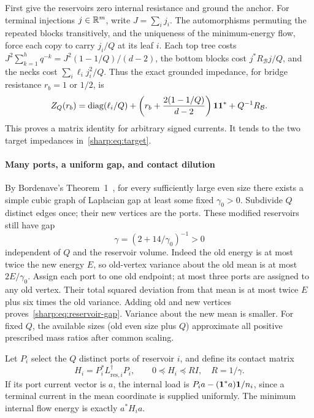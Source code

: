 First give the reservoirs zero internal resistance and ground the
anchor. For terminal injections $j\in\mathbb R^m$, write $J=\sum_i j_i$.
The automorphisms permuting the repeated blocks transitively, and the
uniqueness of the minimum-energy flow, force each copy to carry
$j_i/Q$ at its leaf $i$. Each top tree costs
$J^2\sum_{k=1}^h q^{-k}=J^2(1-1/Q)/(d-2)$, the bottom
blocks cost $j^*R_{\mathcal B}j/Q$, and the necks cost
$\sum_i\ell_i j_i^2/Q$. Thus the exact grounded impedance, for bridge
resistance $r_b=1$ or $1/2$, is
\begin{equation}\label{sharp:eq:ideal-impedance}
 Z_Q(r_b)=\operatorname{diag}(\ell_i/Q)+\left(r_b+\frac{2(1-1/Q)}{d-2}\right)\boldsymbol 1\boldsymbol 1^*
                                      +Q^{-1}R_{\mathcal B}.
\end{equation}
This proves a matrix identity for arbitrary signed currents. It tends
to the two target impedances in~\eqref{sharp:eq:target}.

\paragraph{Many ports, a uniform gap, and contact dilution}
By Bordenave's Theorem~1~\cite{Bordenave}, for every sufficiently large
even size there exists a simple cubic graph of Laplacian gap at least
some fixed $\gamma_0>0$. Subdivide $Q$ distinct edges once; their new
vertices are the ports. These modified reservoirs still have gap
\begin{equation}\label{sharp:eq:reservoir-gap}
                    \gamma=(2+14/\gamma_0)^{-1}>0
\end{equation}
independent of $Q$ and the reservoir volume. Indeed the old energy is
at most twice the new energy $E$, so old-vertex variance about the old
mean is at most $2E/\gamma_0$. Assign each port to one old endpoint;
at most three ports are assigned to any old vertex. Their total squared
deviation from that mean is at most twice $E$ plus six times the old
variance. Adding old and new vertices proves~\eqref{sharp:eq:reservoir-gap}.
Variance about the new mean is smaller. For fixed $Q$, the available
sizes (old even size plus $Q$) approximate all positive prescribed
mass ratios after common scaling.

Let $P_i$ select the $Q$ distinct ports of reservoir $i$, and define
its contact matrix
\[
 H_i=P_i^*L_{\mathrm{res},i}^\dagger P_i,
                     \qquad0\preceq H_i\preceq R I,\quad R=1/\gamma.
\]
If its port current vector is $a$, the internal load is
$P_ia-(\boldsymbol 1^*a)\boldsymbol 1/n_i$, since a terminal current in the mean
coordinate is supplied uniformly. The minimum internal flow energy
is exactly $a^*H_i a$.

